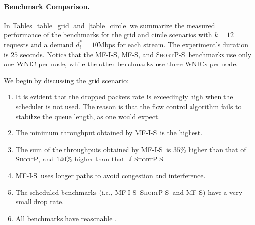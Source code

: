 \documentclass[12pt,oneside,english,a4paper]{book}
\theoremstyle{plain}
\theoremstyle{definition}
\theoremstyle{Theorem}
\theoremstyle{plain}
\newenvironment{proof sketch}[1]{\noindent {\emph{Proof sketch of #1:}}}{\hfill \qed}
\newcommand{\PER}{\text{\sc{per}}}
\newcommand{\algA}{\textsc{MF-I-S}}
\newcommand{\algB}{\textsc{ShortP}}
\newcommand{\algBS}{\textsc{ShortP-S}}
\newcommand{\algE}{\textsc{MF-S}}
\newcommand{\algS}{\algB}
\begin{document}

\paragraph{Benchmark Comparison.}
In Tables~\ref{table_grid} and~\ref{table_circle} we summarize the
measured performance of the benchmarks for the grid and circle
scenarios with $k=12$ requests and a demand $d^*_i=10$Mbps for each
stream. The experiment's duration is $25$ seconds.
Notice that the \algA , \algE , and \algBS\ benchmarks use only one WNIC
per node, while the other benchmarks use three WNICs per node.

We begin by discussing the grid scenario:
\begin{enumerate}[(1)]
\item It is evident that the dropped packets
    rate is exceedingly high when the scheduler is not used. The reason is
    that the flow control algorithm fails to stabilize the queue length, as
    one would expect.
\item The minimum throughput obtained by \algA\ is the highest.
\item The sum of the throughputs obtained by \algA\ is $35$\% higher
  than that of \algS, and $140$\% higher
  than that of \algBS.
\item \algA\ uses longer paths to avoid congestion and interference.
\item The scheduled benchmarks (i.e., \algA\, \algBS\ and \algE ) have a very small drop rate.
\item  All benchmarks have reasonable \PER.
\end{enumerate}
\end{document}
